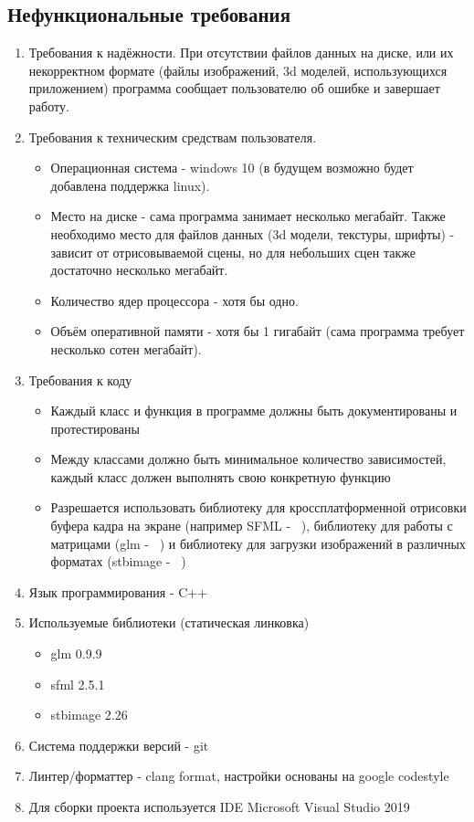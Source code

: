 \documentclass{article}
\begin{document}
\subsection{Нефункциональные требования}
\begin{enumerate}
	\item Требования к надёжности. При отсутствии файлов данных на диске, или их некорректном формате (файлы изображений, 3d моделей, использующихся приложением) программа сообщает пользователю об ошибке и завершает работу.
	\item Требования к техническим средствам пользователя. 
		\begin{itemize}
			\item Операционная система - windows 10 (в будущем возможно будет добавлена поддержка linux).
			\item Место на диске - сама программа занимает несколько мегабайт. Также необходимо место для файлов данных (3d модели, текстуры, шрифты) - зависит от отрисовываемой сцены, но для небольших сцен также достаточно несколько мегабайт.
			\item Количество ядер процессора - хотя бы одно.
			\item Объём оперативной памяти - хотя бы 1 гигабайт (сама программа требует несколько сотен мегабайт).
		\end{itemize}
	\item Требования к коду
	\begin{itemize}
	\item Каждый класс и функция в программе должны быть документированы и протестированы
	\item Между классами должно быть минимальное количество зависимостей, каждый класс должен выполнять свою конкретную функцию
	\item Разрешается использовать библиотеку для кроссплатформенной отрисовки буфера кадра на экране (например SFML - ~\cite{sfml}), библиотеку для работы с матрицами (glm -  ~\cite{glm}) и библиотеку для загрузки изображений в различных форматах (stb\textunderscore image - ~\cite{stb})
	\end{itemize}
	\item Язык программирования - C++
	\item Используемые библиотеки (статическая линковка)
		\begin{itemize}
			\item glm 0.9.9 ~\cite{glm}
			\item sfml 2.5.1 ~\cite{sfml}
			\item stb\textunderscore image 2.26 ~\cite{stb}
		\end{itemize}
	\item Система поддержки версий - git
	\item Линтер/форматтер - clang format, настройки основаны на google codestyle
	\item Для сборки проекта используется IDE Microsoft Visual Studio 2019
\end{enumerate}
\end{document}
